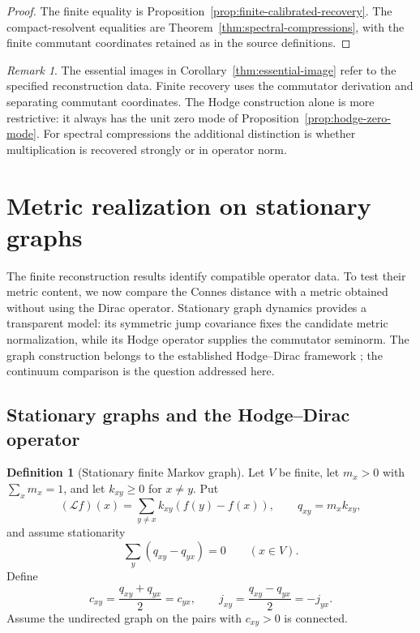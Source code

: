 \documentclass[11pt]{article}
\theoremstyle{definition}
\newtheorem{definition}[definition]{Definition}
\theoremstyle{remark}
\newtheorem{remark}[remark]{Remark}
\theoremstyle{definition}
\theoremstyle{remark}
\begin{document}
\begin{proof}
The finite equality is Proposition~\ref{prop:finite-calibrated-recovery}.
The compact-resolvent equalities are Theorem~\ref{thm:spectral-compressions}, with
the finite commutant coordinates retained as in the source definitions.
\end{proof}

\begin{remark}
The essential images in Corollary~\ref{thm:essential-image} refer to the
specified reconstruction data.  Finite recovery uses the commutator derivation
and separating commutant coordinates.  The Hodge construction alone is more
restrictive: it always has the unit zero mode of
Proposition~\ref{prop:hodge-zero-mode}.  For spectral compressions the
additional distinction is whether multiplication is recovered strongly or
in operator norm.
\end{remark}



\section{Metric realization on stationary graphs}
\label{sec:metric}

The finite reconstruction results identify compatible operator data.  To test their
metric content, we now compare the Connes distance with a metric obtained without
using the Dirac operator.  Stationary graph dynamics provides a transparent model:
its symmetric jump covariance fixes the candidate metric normalization, while its
Hodge operator supplies the commutator seminorm.  The graph construction belongs
to the established Hodge--Dirac framework \cite{Davies1993,Requardt2002}; the
continuum comparison is the question addressed here.

\subsection{Stationary graphs and the Hodge--Dirac operator}

\begin{definition}[Stationary finite Markov graph]
\label{def:supp-renewal-graph}
Let $V$ be finite, let $m_x>0$ with $\sum_xm_x=1$, and let $k_{xy}\ge0$ for
$x\ne y$.  Put
\begin{equation}
 (\mathcal Lf)(x)=\sum_{y\ne x}k_{xy}(f(y)-f(x)),
 \qquad q_{xy}=m_xk_{xy},
 \label{eq:supp-renewal-generator}
\end{equation}
and assume stationarity
\begin{equation}
 \sum_y(q_{xy}-q_{yx})=0
 \qquad(x\in V).
 \label{eq:supp-stationarity}
\end{equation}
Define
\begin{equation}
 c_{xy}=\frac{q_{xy}+q_{yx}}2=c_{yx},
 \qquad
 j_{xy}=\frac{q_{xy}-q_{yx}}2=-j_{yx}.
 \label{eq:supp-conductance-current}
\end{equation}
Assume the undirected graph on the pairs with $c_{xy}>0$ is connected.
\end{definition}
\end{document}
